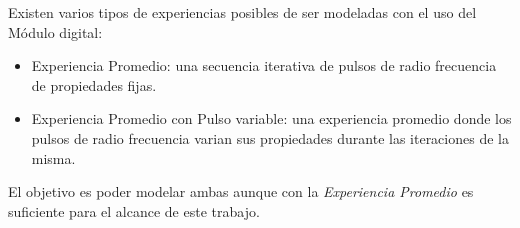 Existen varios tipos de experiencias posibles de ser modeladas 
con el uso del M\'odulo digital:

\begin{itemize}
    \item Experiencia Promedio: una secuencia iterativa de 
    pulsos de radio frecuencia de propiedades fijas.

    \item Experiencia Promedio con Pulso variable: una 
    experiencia promedio donde los pulsos de radio frecuencia 
    varian sus propiedades durante las iteraciones de la misma.

\end{itemize}

El objetivo es poder modelar ambas aunque con la \textit{Experiencia Promedio} es 
suficiente para el alcance de este trabajo.


\newpage